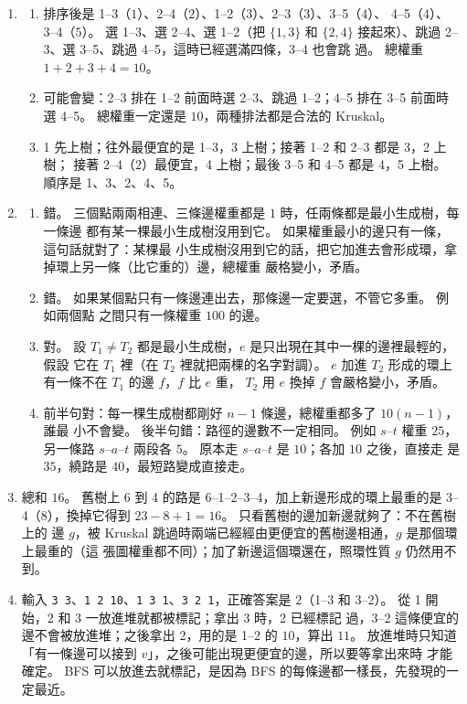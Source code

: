 \begin{enumerate}
\item
\begin{enumerate}
\item 排序後是 1--3（$1$）、2--4（$2$）、1--2（$3$）、2--3（$3$）、3--5（$4$）、
4--5（$4$）、3--4（$5$）。 選 1--3、選 2--4、選 1--2（把 $\{1, 3\}$ 和
$\{2, 4\}$ 接起來）、跳過 2--3、選 3--5、跳過 4--5，這時已經選滿四條，3--4 也會跳
過。 總權重 $1 + 2 + 3 + 4 = 10$。
\item 可能會變：2--3 排在 1--2 前面時選 2--3、跳過 1--2；4--5 排在 3--5 前面時選
4--5。 總權重一定還是 $10$，兩種排法都是合法的 Kruskal。
\item 1 先上樹；往外最便宜的是 1--3，3 上樹；接著 1--2 和 2--3 都是 $3$，2 上樹；
接著 2--4（$2$）最便宜，4 上樹；最後 3--5 和 4--5 都是 $4$，5 上樹。 順序是
1、3、2、4、5。
\end{enumerate}

\item
\begin{enumerate}
\item 錯。 三個點兩兩相連、三條邊權重都是 $1$ 時，任兩條都是最小生成樹，每一條邊
都有某一棵最小生成樹沒用到它。 如果權重最小的邊只有一條，這句話就對了：某棵最
小生成樹沒用到它的話，把它加進去會形成環，拿掉環上另一條（比它重的）邊，總權重
嚴格變小，矛盾。
\item 錯。 如果某個點只有一條邊連出去，那條邊一定要選，不管它多重。 例如兩個點
之間只有一條權重 $100$ 的邊。
\item 對。 設 $T_1 \ne T_2$ 都是最小生成樹，$e$ 是只出現在其中一棵的邊裡最輕的，假設
它在 $T_1$ 裡（在 $T_2$ 裡就把兩棵的名字對調）。 $e$ 加進 $T_2$ 形成的環上有一條不在 $T_1$ 的邊 $f$，$f$ 比 $e$ 重，
$T_2$ 用 $e$ 換掉 $f$ 會嚴格變小，矛盾。
\item 前半句對：每一棵生成樹都剛好 $n - 1$ 條邊，總權重都多了 $10(n - 1)$，誰最
小不會變。 後半句錯：路徑的邊數不一定相同。 例如 $s$--$t$ 權重 $25$，另一條路
$s$--$a$--$t$ 兩段各 $5$。 原本走 $s$--$a$--$t$ 是 $10$；各加 $10$ 之後，直接走
是 $35$，繞路是 $40$，最短路變成直接走。
\end{enumerate}

\item 總和 $16$。 舊樹上 6 到 4 的路是 6--1--2--3--4，加上新邊形成的環上最重的是
3--4（$8$），換掉它得到 $23 - 8 + 1 = 16$。 只看舊樹的邊加新邊就夠了：不在舊樹上的
邊 $g$，被 Kruskal 跳過時兩端已經經由更便宜的舊樹邊相通，$g$ 是那個環上最重的（這
張圖權重都不同）；加了新邊這個環還在，照環性質 $g$ 仍然用不到。

\item 輸入 \texttt{3 3}、\texttt{1 2 10}、\texttt{1 3 1}、\texttt{3 2 1}，正確答案是
$2$（1--3 和 3--2）。 從 1 開始，2 和 3 一放進堆就都被標記；拿出 3 時，2 已經標記
過，3--2 這條便宜的邊不會被放進堆；之後拿出 2，用的是 1--2 的 $10$，算出 $11$。
放進堆時只知道「有一條邊可以接到 $v$」，之後可能出現更便宜的邊，所以要等拿出來時
才能確定。 BFS 可以放進去就標記，是因為 BFS 的每條邊都一樣長，先發現的一定最近。


\end{enumerate}

